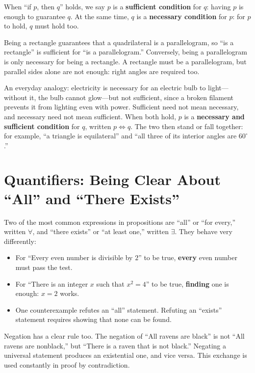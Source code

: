 When ``if $p$, then $q$'' holds, we say $p$ is a \textbf{sufficient condition} for $q$: having $p$ is enough to guarantee $q$. At the same time, $q$ is a \textbf{necessary condition} for $p$: for $p$ to hold, $q$ must hold too.

\begin{li}
Being a rectangle guarantees that a quadrilateral is a parallelogram, so ``is a rectangle'' is sufficient for ``is a parallelogram.'' Conversely, being a parallelogram is only necessary for being a rectangle. A rectangle must be a parallelogram, but parallel sides alone are not enough: right angles are required too.
\end{li}

An everyday analogy: electricity is necessary for an electric bulb to light---without it, the bulb cannot glow---but not sufficient, since a broken filament prevents it from lighting even with power. Sufficient need not mean necessary, and necessary need not mean sufficient. When both hold, $p$ is a \textbf{necessary and sufficient condition} for $q$, written $p\Leftrightarrow q$. The two then stand or fall together: for example, ``a triangle is equilateral'' and ``all three of its interior angles are $60^\circ$.''

\section{Quantifiers: Being Clear About ``All'' and ``There Exists''}

Two of the most common expressions in propositions are ``all'' or ``for every,'' written $\forall$, and ``there exists'' or ``at least one,'' written $\exists$. They behave very differently:

\begin{itemize}
\item For ``Every even number is divisible by $2$'' to be true, \textbf{every} even number must pass the test.
\item For ``There is an integer $x$ such that $x^2=4$'' to be true, \textbf{finding} one is enough: $x=2$ works.
\item One counterexample refutes an ``all'' statement. Refuting an ``exists'' statement requires showing that none can be found.
\end{itemize}

Negation has a clear rule too. The negation of ``All ravens are black'' is not ``All ravens are nonblack,'' but ``There is a raven that is not black.'' Negating a universal statement produces an existential one, and vice versa. This exchange is used constantly in proof by contradiction.

